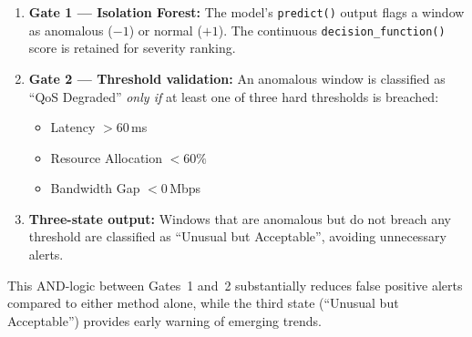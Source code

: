 \documentclass[11pt, a4paper]{article}
\begin{document}
\begin{enumerate}
    \item \textbf{Gate 1 --- Isolation Forest:} The model's \texttt{predict()} output flags a window as anomalous ($-1$) or normal ($+1$). The continuous \texttt{decision\_function()} score is retained for severity ranking.
    \item \textbf{Gate 2 --- Threshold validation:} An anomalous window is classified as ``QoS Degraded'' \emph{only if} at least one of three hard thresholds is breached:
    \begin{itemize}
        \item Latency $> 60$\,ms
        \item Resource Allocation $< 60\%$
        \item Bandwidth Gap $< 0$\,Mbps
    \end{itemize}
    \item \textbf{Three-state output:} Windows that are anomalous but do not breach any threshold are classified as ``Unusual but Acceptable'', avoiding unnecessary alerts.
\end{enumerate}

This AND-logic between Gates~1 and~2 substantially reduces false positive alerts compared to either method alone, while the third state (``Unusual but Acceptable'') provides early warning of emerging trends.
\end{document}
